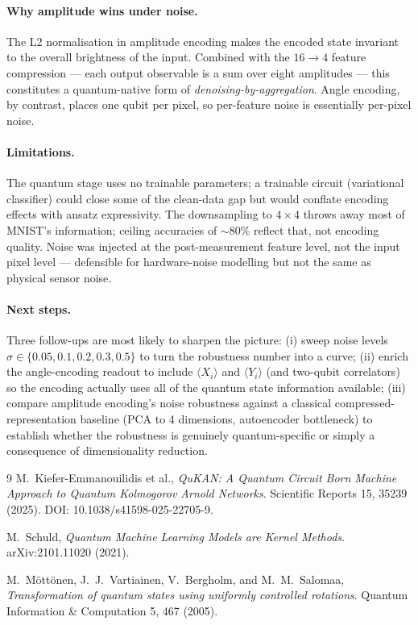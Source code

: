 \documentclass[11pt,a4paper]{article}
\begin{document}
\paragraph{Why amplitude wins under noise.}
The L2 normalisation in amplitude encoding makes the encoded state
invariant to the overall brightness of the input. Combined with the
$16\!\to\!4$ feature compression — each output observable is a sum over
eight amplitudes — this constitutes a quantum-native form of
\textit{denoising-by-aggregation}. Angle encoding, by contrast, places
one qubit per pixel, so per-feature noise is essentially per-pixel
noise.

\paragraph{Limitations.}
The quantum stage uses no trainable parameters; a trainable circuit
(variational classifier) could close some of the clean-data gap but
would conflate encoding effects with ansatz expressivity. The downsampling
to $4\!\times\!4$ throws away most of MNIST's information; ceiling
accuracies of $\sim$80\% reflect that, not encoding quality. Noise was
injected at the post-measurement feature level, not the input pixel level
— defensible for hardware-noise modelling but not the same as physical
sensor noise.

\paragraph{Next steps.}
Three follow-ups are most likely to sharpen the picture: (i) sweep
noise levels $\sigma \in \{0.05, 0.1, 0.2, 0.3, 0.5\}$ to turn the
robustness number into a curve; (ii) enrich the angle-encoding readout
to include $\langle X_i\rangle$ and $\langle Y_i\rangle$ (and two-qubit
correlators) so the encoding actually uses all of the quantum state
information available; (iii) compare amplitude encoding's noise
robustness against a classical compressed-representation baseline (PCA
to 4 dimensions, autoencoder bottleneck) to establish whether the
robustness is genuinely quantum-specific or simply a consequence of
dimensionality reduction.

\begin{thebibliography}{9}
M.~Kiefer-Emmanouilidis et al.,
\textit{QuKAN: A Quantum Circuit Born Machine Approach to Quantum
Kolmogorov Arnold Networks}.
Scientific Reports 15, 35239 (2025). DOI: 10.1038/s41598-025-22705-9.

M.~Schuld,
\textit{Quantum Machine Learning Models are Kernel Methods}.
arXiv:2101.11020 (2021).

M.~Möttönen, J.~J.~Vartiainen, V.~Bergholm, and M.~M.~Salomaa,
\textit{Transformation of quantum states using uniformly controlled
rotations}.
Quantum Information \& Computation 5, 467 (2005).
\end{thebibliography}
\end{document}
